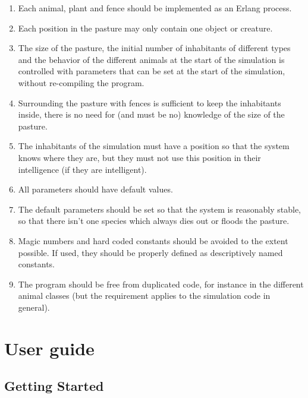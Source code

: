 \documentclass[12pt]{article}
\begin{document}
\begin{enumerate}
\item Each animal, plant and fence should be implemented as an Erlang process.

\item Each position in the pasture may only contain one object or creature.

\item The size of the pasture, the initial number of inhabitants of different types and the behavior of the different animals at the start of the simulation is controlled with parameters that can be set at the start of the simulation, without re-compiling the program.

\item Surrounding the pasture with fences is sufficient to keep the inhabitants inside, there is no need for (and must be no) knowledge of the size of the pasture.

\item The inhabitants of the simulation must have a position so that the system knows where they are, but they must not use this position in their intelligence (if they are intelligent).

\item All parameters should have default values.

\item The default parameters should be set so that the system is reasonably stable, so that there isn't one species which always dies out or floods the pasture.

\item Magic numbers and hard coded constants should be avoided to the extent possible. If used, they should be properly defined as descriptively named constants.

\item The program should be free from duplicated code, for instance in the different animal classes (but the requirement applies to the simulation code in general).
\end{enumerate}

\newpage

\section{User guide}

\subsection{Getting Started}
\end{document}
